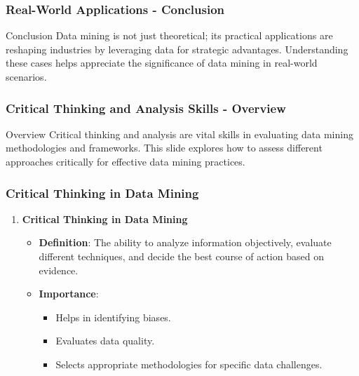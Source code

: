\documentclass{beamer}
\begin{document}
\begin{frame}[fragile]
    \frametitle{Real-World Applications - Conclusion}
    \begin{block}{Conclusion}
        Data mining is not just theoretical; its practical applications are reshaping industries by leveraging data for strategic advantages. 
        Understanding these cases helps appreciate the significance of data mining in real-world scenarios.
    \end{block}
\end{frame}

\begin{frame}[fragile]
    \frametitle{Critical Thinking and Analysis Skills - Overview}
    \begin{block}{Overview}
        Critical thinking and analysis are vital skills in evaluating data mining methodologies and frameworks. 
        This slide explores how to assess different approaches critically for effective data mining practices.
    \end{block}
\end{frame}

\begin{frame}[fragile]
    \frametitle{Critical Thinking in Data Mining}
    \begin{enumerate}
        \item \textbf{Critical Thinking in Data Mining}
        \begin{itemize}
            \item \textbf{Definition}: The ability to analyze information objectively, evaluate different techniques, and decide the best course of action based on evidence.
            \item \textbf{Importance}: 
            \begin{itemize}
                \item Helps in identifying biases.
                \item Evaluates data quality.
                \item Selects appropriate methodologies for specific data challenges.
            \end{itemize}
        \end{itemize}
    \end{enumerate}
\end{frame}
\end{document}
